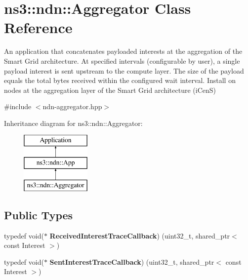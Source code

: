 \hypertarget{classns3_1_1ndn_1_1Aggregator}{}\section{ns3\+:\+:ndn\+:\+:Aggregator Class Reference}
\label{classns3_1_1ndn_1_1Aggregator}


An application that concatenates payloaded interests at the aggregation of the Smart Grid architecture. At specified intervals (configurable by user), a single payload interest is sent upstream to the compute layer. The size of the payload equals the total bytes received within the configured wait interval. Install on nodes at the aggregation layer of the Smart Grid architecture (i\+CenS)  




{\ttfamily \#include $<$ndn-\/aggregator.\+hpp$>$}

Inheritance diagram for ns3\+:\+:ndn\+:\+:Aggregator\+:\begin{figure}[H]
\begin{center}
\leavevmode
\includegraphics[height=3.000000cm]{classns3_1_1ndn_1_1Aggregator}
\end{center}
\end{figure}
\subsection*{Public Types}
\begin{DoxyCompactItemize}
\item 
typedef void($\ast$ {\bfseries Received\+Interest\+Trace\+Callback}) (uint32\+\_\+t, shared\+\_\+ptr$<$ const Interest $>$)\hypertarget{classns3_1_1ndn_1_1Aggregator_a8c8be4a5741cb3134650caff3294d3ab}{}\label{classns3_1_1ndn_1_1Aggregator_a8c8be4a5741cb3134650caff3294d3ab}

\item 
typedef void($\ast$ {\bfseries Sent\+Interest\+Trace\+Callback}) (uint32\+\_\+t, shared\+\_\+ptr$<$ const Interest $>$)\hypertarget{classns3_1_1ndn_1_1Aggregator_a1e9bf9499a58296d3befbf1f2948f07b}{}\label{classns3_1_1ndn_1_1Aggregator_a1e9bf9499a58296d3befbf1f2948f07b}

\end{DoxyCompactItemize}
